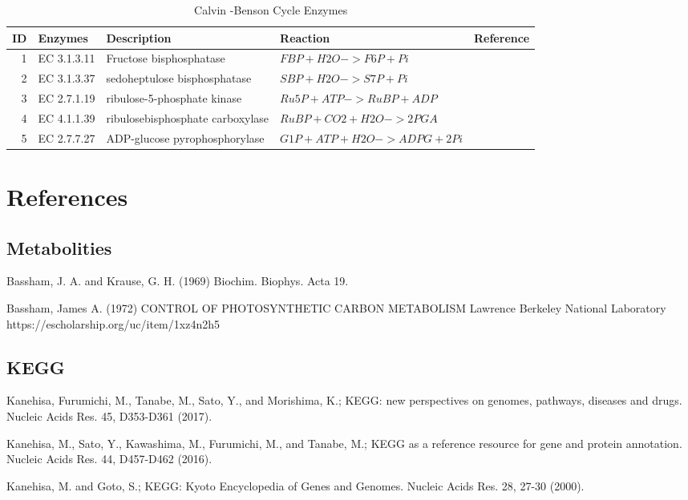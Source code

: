 \centering
\begin{table}[H]\footnotesize
	\caption{Calvin -Benson Cycle Enzymes}
	\begin{tabular}{rp{1cm}p{2cm}p{3cm}p{1cm}}
		\hline
		ID & Enzymes & Description & Reaction & Reference \\
		\hline
		1 & EC 3.1.3.11 & Fructose bisphosphatase & $FBP + H2O->F6P + Pi$ &\cite{key4000} \\
		2 & EC 3.1.3.37 &  sedoheptulose bisphosphatase &$SBP + H2O->S7P + Pi$ &\cite{key4000} \\
		3 & EC 2.7.1.19 & ribulose-5-phosphate kinase & $Ru5P + ATP->RuBP + ADP$ & \cite{key4000} \\
		4 & EC 4.1.1.39 &  ribulosebisphosphate carboxylase & $RuBP + CO2+ H2O->2 PGA$ & \cite{key4000} \\
		5 & EC 2.7.7.27 &  ADP-glucose pyrophosphorylase  &$G1P + ATP + H2O->ADPG + 2 Pi$ & \cite{key4000} \\
		\hline
	\end{tabular}
\end{table}
\raggedright


\section{References}


\subsection{Metabolities}

 Bassham, J. A.  and Krause, G. H. (1969) 
\newblock Biochim. Biophys. Acta 19. 

Bassham, James A. (1972)
\newblock CONTROL OF PHOTOSYNTHETIC CARBON METABOLISM
\newblock Lawrence Berkeley National Laboratory https://escholarship.org/uc/item/1xz4n2h5


\subsection{KEGG}

 Kanehisa, Furumichi, M., Tanabe, M., Sato, Y., and Morishima, K.; 
\newblock KEGG: new perspectives on genomes, pathways, diseases and drugs. 
\newblock Nucleic Acids Res. 45, D353-D361 (2017).

 Kanehisa, M., Sato, Y., Kawashima, M., Furumichi, M., and Tanabe, M.; 
\newblock KEGG as a reference resource for gene and protein annotation. 
\newblock Nucleic Acids Res. 44, D457-D462 (2016).

 Kanehisa, M. and Goto, S.; 
\newblock KEGG: Kyoto Encyclopedia of Genes and Genomes. 
\newblock Nucleic Acids Res. 28, 27-30 (2000). 
